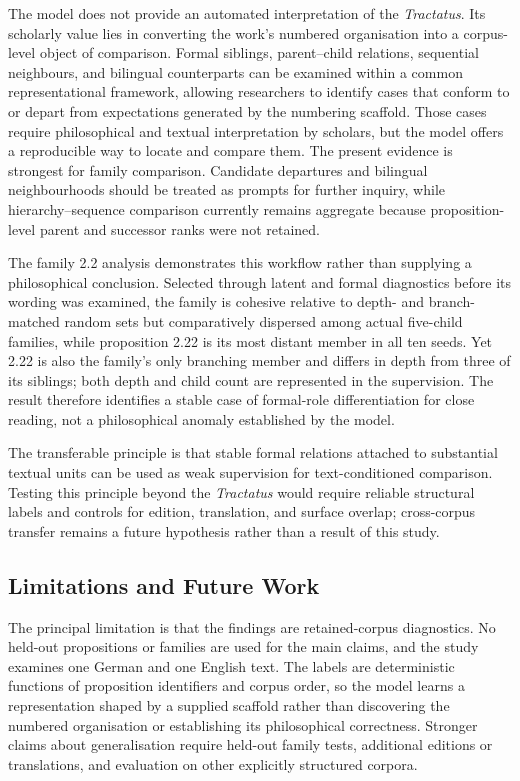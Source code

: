 \documentclass[webpdf,modern,medium,namedate]{oup-authoring-template}
\begin{document}
The model does not provide an automated interpretation of the \emph{Tractatus}. Its scholarly value lies in converting the work's numbered organisation into a corpus-level object of comparison. Formal siblings, parent--child relations, sequential neighbours, and bilingual counterparts can be examined within a common represen\-tational framework, allowing researchers to identify cases that conform to or depart from expectations generated by the numbering scaffold. Those cases require philosophical and textual interpretation by scholars, but the model offers a reproducible way to locate and compare them. The present evidence is strongest for family comparison. Candidate departures and bilingual neighbourhoods should be treated as prompts for further inquiry, while hierarchy--sequence comparison currently remains aggregate because proposition-level parent and successor ranks were not retained.

The family 2.2 analysis demonstrates this workflow rather than supplying a philosophical conclusion. Selected through latent and formal diagnostics before its wording was examined, the family is cohesive relative to depth- and branch-matched random sets but comparatively dispersed among actual five-child families, while proposition 2.22 is its most distant member in all ten seeds. Yet 2.22 is also the family's only branching member and differs in depth from three of its siblings; both depth and child count are represented in the supervision. The result therefore identifies a stable case of formal-role differentiation for close reading, not a philosophical anomaly established by the model.

The transferable principle is that stable formal relations attached to substantial textual units can be used as weak supervision for text-conditioned comparison. Testing this principle beyond the \emph{Tractatus} would require reliable structural labels and controls for edition, translation, and surface overlap; cross-corpus transfer remains a future hypothesis rather than a result of this study.

\subsection{Limitations and Future Work}
The principal limitation is that the findings are retained-corpus diagnostics. No held-out propositions or families are used for the main claims, and the study examines one German and one English text. The labels are deterministic functions of proposition identifiers and corpus order, so the model learns a representation shaped by a supplied scaffold rather than discovering the numbered organisation or establishing its philosophical correctness. Stronger claims about generalisation require held-out family tests, additional editions or translations, and evaluation on other explicitly structured corpora.
\end{document}

